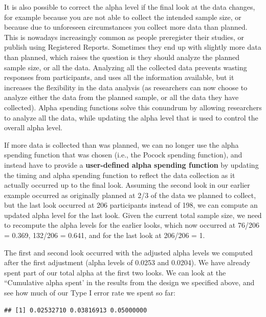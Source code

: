 \documentclass[
  oneside]{krantz}
\makeatletter
\newenvironment{Shaded}{\begin{snugshade}}{\end{snugshade}}
\newcommand{\NormalTok}[1]{#1}
\newcommand{\SpecialCharTok}[1]{\textcolor[rgb]{0,0,0}{#1}}
\newenvironment{kframe}{%
\medskip{}
\setlength{\fboxsep}{.8em}
 \def\at@end@of@kframe{}%
 \ifinner\ifhmode%
  \def\at@end@of@kframe{\end{minipage}}%
  \begin{minipage}{\columnwidth}%
 \fi\fi%
 \def\FrameCommand##1{\hskip\@totalleftmargin \hskip-\fboxsep
 \colorbox{shadecolor}{##1}\hskip-\fboxsep
     \hskip-\linewidth \hskip-\@totalleftmargin \hskip\columnwidth}%
 \MakeFramed {\advance\hsize-\width
   \@totalleftmargin\z@ \linewidth\hsize
   \@setminipage}}%
 {\par\unskip\endMakeFramed%
 \at@end@of@kframe}
\renewenvironment{Shaded}{\begin{kframe}}{\end{kframe}}
\makeatother
\begin{document}
It is also possible to correct the alpha level if the final look at the data changes, for example because you are not able to collect the intended sample size, or because due to unforeseen circumstances you collect more data than planned. This is nowadays increasingly common as people preregister their studies, or publish using Registered Reports. Sometimes they end up with slightly more data than planned, which raises the question is they should analyze the planned sample size, or all the data. Analyzing all the collected data prevents wasting responses from participants, and uses all the information available, but it increases the flexibility in the data analysis (as researchers can now choose to analyze either the data from the planned sample, or all the data they have collected). Alpha spending functions solve this conundrum by allowing researchers to analyze all the data, while updating the alpha level that is used to control the overall alpha level.

If more data is collected than was planned, we can no longer use the alpha spending function that was chosen (i.e., the Pocock spending function), and instead have to provide a \textbf{user-defined alpha spending function} by updating the timing and alpha spending function to reflect the data collection as it actually occurred up to the final look. Assuming the second look in our earlier example occurred as originally planned at 2/3 of the data we planned to collect, but the last look occurred at 206 participants instead of 198, we can compute an updated alpha level for the last look. Given the current total sample size, we need to recompute the alpha levels for the earlier looks, which now occurred at 76/206 = 0.369, 132/206 = 0.641, and for the last look at 206/206 = 1.

The first and second look occurred with the adjusted alpha levels we computed after the first adjustment (alpha levels of 0.0253 and 0.0204). We have already spent part of our total alpha at the first two looks. We can look at the ``Cumulative alpha spent' in the results from the design we specified above, and see how much of our Type I error rate we spent so far:

\begin{Shaded}
\end{Shaded}

\begin{verbatim}
## [1] 0.02532710 0.03816913 0.05000000
\end{verbatim}
\end{document}
